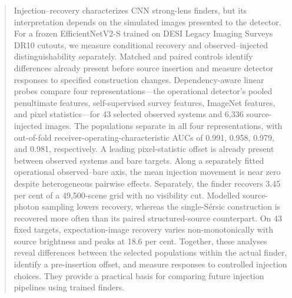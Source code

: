 \begin{abstract}
Injection--recovery characterizes CNN strong-lens finders, but its
interpretation depends on the simulated images presented to the detector. For
a frozen EfficientNetV2-S trained on DESI Legacy Imaging Surveys DR10 cutouts,
we measure conditional recovery and observed--injected distinguishability
separately. Matched and paired controls identify differences already present
before source insertion and measure detector responses to specified
construction changes. Dependency-aware linear probes compare four
representations---the operational detector's pooled penultimate features,
self-supervised survey features, ImageNet features, and pixel statistics---for
43 selected observed systems and 6,336 source-injected images.
The populations separate in all four representations, with out-of-fold
receiver-operating-characteristic AUCs of 0.991, 0.958, 0.979, and 0.981,
respectively. A leading pixel-statistic offset is already present between
observed systems and bare targets. Along a separately fitted operational
observed--bare axis, the mean injection movement is near zero despite
heterogeneous pairwise effects. Separately, the finder recovers 3.45 per cent
of a 49,500-scene grid with no visibility cut. Modelled source-photon sampling
lowers recovery, whereas the single-S\'{e}rsic construction is recovered more
often than its paired structured-source counterpart. On 43 fixed targets,
expectation-image recovery varies non-monotonically with source brightness and
peaks at 18.6 per cent.
Together, these analyses reveal differences between the selected populations
within the actual finder, identify a pre-insertion offset, and measure
responses to controlled injection choices. They provide a practical basis for
comparing future injection pipelines using trained finders.
\end{abstract}
